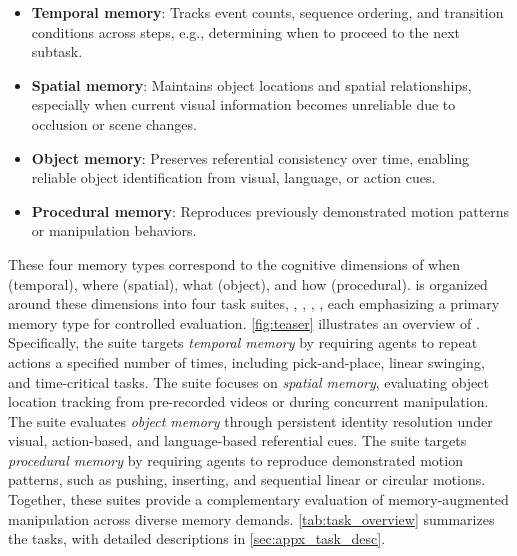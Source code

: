 \begin{itemize}[itemsep=1pt, topsep=0pt, leftmargin=*]
\item \textbf{Temporal memory}: Tracks event counts, sequence ordering, and transition conditions across steps, e.g., determining when to proceed to the next subtask.

\item \textbf{Spatial memory}: Maintains object locations and spatial relationships, especially when current visual information becomes unreliable due to occlusion or scene changes.

\item \textbf{Object memory}: Preserves referential consistency over time, enabling reliable object identification from visual, language, or action cues.

\item \textbf{Procedural memory}: Reproduces previously demonstrated motion patterns or manipulation behaviors.

\end{itemize}

These four memory types correspond to the cognitive dimensions of when (temporal), where (spatial), what (object), and how (procedural).
\benchname\xspace is organized around these dimensions into four task suites, \TSone, \TStwo, \TSthree, \TSfour, each emphasizing a primary memory type for controlled evaluation. \cref{fig:teaser} illustrates an overview of \benchname. Specifically, the \TSone\xspace suite targets \textit{temporal memory} by requiring agents to repeat actions a specified number of times, including pick-and-place, linear swinging, and time-critical  tasks.
The \TStwo\xspace suite focuses on \textit{spatial memory}, evaluating object location tracking from pre-recorded videos or during concurrent manipulation.
The \TSthree\xspace suite evaluates \textit{object memory} through persistent identity resolution under visual, action-based, and language-based referential cues.
The \TSfour\xspace suite targets \textit{procedural memory} by requiring agents to reproduce demonstrated motion patterns, such as pushing, inserting, and sequential linear or circular motions.
Together, these suites provide a complementary evaluation of memory-augmented manipulation across diverse memory demands.
\cref{tab:task_overview} summarizes the tasks, with detailed descriptions in \cref{sec:appx_task_desc}.


